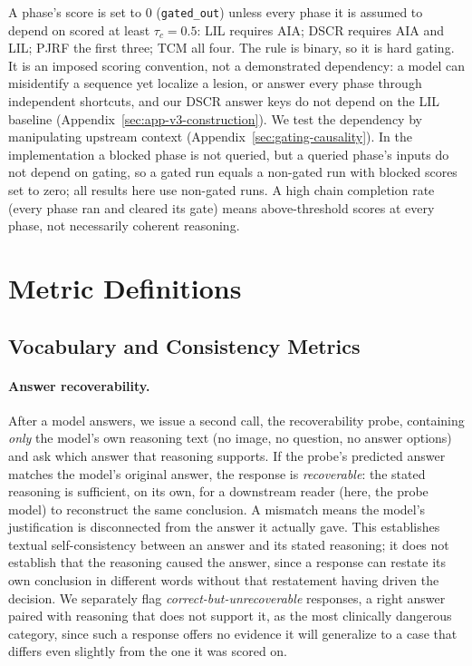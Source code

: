 \documentclass[11pt]{article}
\begin{document}
A phase's score is set to $0$ (\texttt{gated\_out}) unless every phase it is assumed to depend on scored at least $\tau_c=0.5$: LIL requires AIA; DSCR requires AIA and LIL; PJRF the first three; TCM all four. The rule is binary, so it is hard gating. It is an imposed scoring convention, not a demonstrated dependency: a model can misidentify a sequence yet localize a lesion, or answer every phase through independent shortcuts, and our DSCR answer keys do not depend on the LIL baseline (Appendix~\ref{sec:app-v3-construction}). We test the dependency by manipulating upstream context (Appendix~\ref{sec:gating-causality}). In the implementation a blocked phase is not queried, but a queried phase's inputs do not depend on gating, so a gated run equals a non-gated run with blocked scores set to zero; all results here use non-gated runs. A high chain completion rate (every phase ran and cleared its gate) means above-threshold scores at every phase, not necessarily coherent reasoning.


\section{Metric Definitions}
\label{sec:app-metrics}

\subsection{Vocabulary and Consistency Metrics}

\paragraph{Answer recoverability.} After a model answers, we issue a second call, the recoverability probe, containing \emph{only} the model's own reasoning text (no image, no question, no answer options) and ask which answer that reasoning supports. If the probe's predicted answer matches the model's original answer, the response is \emph{recoverable}: the stated reasoning is sufficient, on its own, for a downstream reader (here, the probe model) to reconstruct the same conclusion. A mismatch means the model's justification is disconnected from the answer it actually gave. This establishes textual self-consistency between an answer and its stated reasoning; it does not establish that the reasoning caused the answer, since a response can restate its own conclusion in different words without that restatement having driven the decision. We separately flag \emph{correct-but-unrecoverable} responses, a right answer paired with reasoning that does not support it, as the most clinically dangerous category, since such a response offers no evidence it will generalize to a case that differs even slightly from the one it was scored on.
\end{document}
